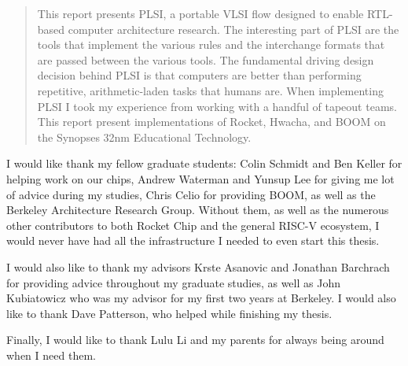\documentclass[masters2]{ucbthesis}
\begin{document}
\begin{frontmatter}

\tableofcontents
\clearpage
\listoffigures

\begin{abstract}
This report presents PLSI, a portable VLSI flow designed to enable RTL-based
computer architecture research.  The interesting part of PLSI are the tools
that implement the various rules and the interchange formats that are passed
between the various tools.  The fundamental driving design decision behind PLSI
is that computers are better than performing repetitive, arithmetic-laden tasks
that humans are.  When implementing PLSI I took my experience from working with
a handful of tapeout teams.  This report present implementations of Rocket,
Hwacha, and BOOM on the Synopses 32nm Educational Technology.
\end{abstract}

\begin{acknowledgements}
I would like thank my fellow graduate students: Colin Schmidt and Ben Keller
for helping work on our chips, Andrew Waterman and Yunsup Lee for giving me lot
of advice during my studies, Chris Celio for providing BOOM, as well as the
Berkeley Architecture Research Group.  Without them, as well as the numerous
other contributors to both Rocket Chip and the general RISC-V ecosystem, I
would never have had all the infrastructure I needed to even start this thesis.

I would also like to thank my advisors Krste Asanovic and Jonathan Barchrach
for providing advice throughout my graduate studies, as well as John
Kubiatowicz who was my advisor for my first two years at Berkeley.  I would
also like to thank Dave Patterson, who helped while finishing my thesis.

Finally, I would like to thank Lulu Li and my parents for always being around
when I need them.
\end{acknowledgements}

\end{frontmatter}

\pagestyle{headings}





\end{document}
